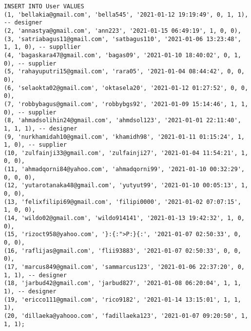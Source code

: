 \begin{lstlisting}
INSERT INTO User VALUES
(1, 'bellakia@gmail.com', 'bella545', '2021-01-12 19:19:49', 0, 1, 1), -- designer
(2, 'annastya@gmail.com', 'ann223', '2021-01-15 06:49:19', 1, 0, 0),
(3, 'satriabagus11@gmail.com', 'satbagus110', '2021-01-06 13:23:48', 1, 1, 0), -- suppllier
(4, 'bagaskara47@gmail.com', 'bagas09', '2021-01-10 18:40:02', 0, 1, 0), -- supplier
(5, 'rahayuputri15@gmail.com', 'rara05', '2021-01-04 08:44:42', 0, 0, 0),
(6, 'selaokta02@gmail.com', 'oktasela20', '2021-01-12 01:27:52', 0, 0, 0),
(7, 'robbybagus@gmail.com', 'robbybgs92', '2021-01-09 15:14:46', 1, 1, 0), -- supplier
(8, 'ahmadsolihin24@gmail.com', 'ahmdsol123', '2021-01-01 22:11:40', 1, 1, 1), -- designer
(9, 'nurkhamidah10@gmail.com', 'khamidh98', '2021-01-11 01:15:24', 1, 1, 0), -- supplier
(10, 'zulfainji33@gmail.com', 'zulfainji27', '2021-01-04 11:54:21', 1, 0, 0),
(11, 'ahmadqorni84@yahoo.com', 'ahmadqorni99', '2021-01-10 00:32:29', 0, 0, 0),
(12, 'yutarotanaka48@gmail.com', 'yutyut99', '2021-01-10 00:05:13', 1, 0, 0),
(13, 'felixfilipi69@gmail.com', 'filipi0000', '2021-01-02 07:07:15', 1, 0, 0),
(14, 'wildo02@gmail.com', 'wildo914141', '2021-01-13 19:42:32', 1, 0, 0),
(15, 'rizoct958@yahoo.com', '}:{:">P:}{:', '2021-01-07 02:50:33', 0, 0, 0),
(16, 'raflijas@gmail.com', 'flii93883', '2021-01-07 02:50:33', 0, 0, 0),
(17, 'marcus849@gmail.com', 'sammarcus123', '2021-01-06 22:37:20', 0, 1, 1), -- designer
(18, 'jarbud42@gmail.com', 'jarbud827', '2021-01-08 06:20:04', 1, 1, 1), -- designer
(19, 'ericco111@gmail.com', 'rico9182', '2021-01-14 13:15:01', 1, 1, 1),
(20, 'dillaeka@yahooo.com', 'fadillaeka123', '2021-01-07 09:20:50', 1, 1, 1);


\end{lstlisting}
